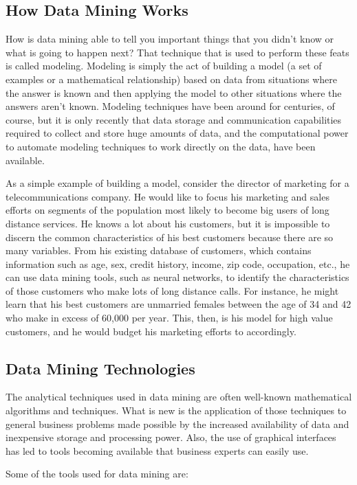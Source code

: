 \documentclass[12pt]{article}
\begin{document}
\subsection{How Data Mining Works}
How is data mining able to tell you important things that you didn't know or what is going to happen next? That technique that is used to perform these feats is called modeling. Modeling is simply the act of building a model (a set of examples or a mathematical relationship) based on data from situations where the answer is known and then applying the model to other situations where the answers aren't known. Modeling techniques have been around for centuries, of course, but it is only recently that data storage and communication capabilities required to collect and store huge amounts of data, and the computational power to automate modeling techniques to work directly on the data, have been available.

As a simple example of building a model, consider the director of marketing for a telecommunications company. He would like to focus his marketing and sales efforts on segments of the population most likely to become big users of long distance services. He knows a lot about his customers, but it is impossible to discern the common characteristics of his best customers because there are so many variables. From his existing database of customers, which contains information such as age, sex, credit history, income, zip code, occupation, etc., he can use data mining tools, such as neural networks, to identify the characteristics of those customers who make lots of long distance calls. For instance, he might learn that his best customers are unmarried females between the age of 34 and 42 who make in excess of 60,000 per year. This, then, is his model for high value customers, and he would budget his marketing efforts to accordingly.

\subsection{Data Mining Technologies}
The analytical techniques used in data mining are often well-known mathematical algorithms and techniques. What is new is the application of those techniques to general business problems made possible by the increased availability of data and inexpensive storage and processing power. Also, the use of graphical interfaces has led to tools becoming available that business experts can easily use.

Some of the tools used for data mining are:
\end{document}

